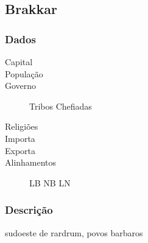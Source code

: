 \subsection{Brakkar}
\subsubsection{Dados}
  \begin{description}
   \item[Capital] 
   \item[Popula\c{c}\~ao] 
   \item[Governo] Tribos Chefiadas
   \item[Religi\~oes]
   \item[Importa]
   \item[Exporta]
   \item[Alinhamentos] LB NB LN
  \end{description}
\subsubsection{Descri\c{c}\~ao}

sudoeste de rardrum, povos barbaros

